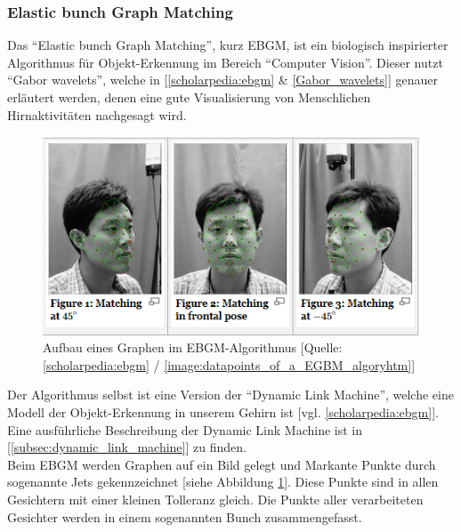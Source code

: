         \subsubsection{Elastic bunch Graph Matching}
        \label{subsubsec:Elastic_bunch_graph_Matching}

            Das \enquote{Elastic bunch Graph Matching}, kurz EBGM, ist ein biologisch inspirierter Algorithmus für Objekt-Erkennung im Bereich \enquote{Computer Vision}. Dieser nutzt \enquote{Gabor wavelets}, welche in [\ref{scholarpedia:ebgm} \& \ref{Gabor_wavelets}] genauer erläutert werden, denen eine gute Visualisierung von Menschlichen Hirnaktivitäten nachgesagt wird.
            \begin{center}
                \begin{figure}[ht]
                    \centering
                    \includegraphics[scale=0.8]{resources/images/img/Face recognition/Elastic Bunch Graph Matching - Figures.png}
                    \caption{Aufbau eines Graphen im EBGM-Algorithmus [Quelle: \ref{scholarpedia:ebgm} / \ref{image:datapoints_of_a_EGBM_algoryhtm}]}
                    \label{fig:Datenpunkte_eines_EGBM-Algorithms}
                \end{figure}
            \end{center}
            Der Algorithmus selbst ist eine Version der \enquote{Dynamic Link Machine}, welche eine Modell der Objekt-Erkennung in unserem Gehirn ist [vgl. \ref{scholarpedia:ebgm}]. Eine ausführliche Beschreibung der Dynamic Link Machine ist in [\ref{subsec:dynamic_link_machine}] zu finden.\\
            Beim EBGM werden Graphen auf ein Bild gelegt und Markante Punkte durch sogenannte Jets gekennzeichnet [siehe Abbildung \ref{fig:Datenpunkte_eines_EGBM-Algorithms}]. Diese Punkte sind in allen Gesichtern mit einer kleinen Tolleranz gleich. Die Punkte aller verarbeiteten Gesichter werden in einem sogenannten Bunch zusammengefasst.

